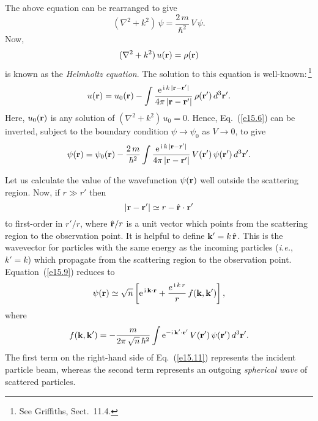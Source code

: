 The above equation can be rearranged to give
\begin{equation}\label{e15.6}
(\nabla^2+k^2)\,\psi = \frac{2\,m}{\hbar^2}\,V\,\psi.
\end{equation}
Now, 
\begin{equation}
(\nabla^2+k^2)\,u({\bf r}) = \rho({\bf r})
\end{equation}
is known as the {\em Helmholtz equation}. The solution to this
equation is well-known:\,\footnote{See Griffiths, Sect.~11.4.}
\begin{equation}
u({\bf r}) = u_0({\bf r}) - \int \frac{{\rm e}^{\,{\rm i}\,k\,|{\bf r}-{\bf r}'|}}
{4\pi\,|{\bf r}-{\bf r}'|}\,\rho({\bf r}')\,d^3{\bf r}'.
\end{equation}
Here, $u_0({\bf r})$ is any solution of $(\nabla^2+k^2)\,u_0 = 0$.
Hence, Eq.~(\ref{e15.6}) can be inverted, subject to the boundary condition
$\psi\rightarrow\psi_0$ as $V\rightarrow 0$, to give
\begin{equation}\label{e15.9}
\psi({\bf r}) = \psi_0({\bf r})- \frac{2\,m}{\hbar^2}
\int\frac{{\rm e}^{\,{\rm i}\,k\,|{\bf r}-{\bf r}'|}}
{4\pi\,|{\bf r}-{\bf r}'|}\,V({\bf r}')\,\psi({\bf r}')\,d^3{\bf r}'.
\end{equation}

Let us calculate the value of the wavefunction $\psi({\bf r})$  well outside the
scattering region. Now, if $r\gg r'$ then
\begin{equation}
|{\bf r}-{\bf r}'| \simeq r - \hat{\bf r}\cdot {\bf r}'
\end{equation}
to first-order in $r'/r$, where $\hat{\bf r}/r$ is a unit vector
which points from the scattering region to the observation point.
It is helpful to define ${\bf k}'=k\,\hat{\bf r}$. This is the wavevector
for particles with the same energy as the incoming particles ({\em i.e.},
$k'=k$) which propagate from the scattering region to the observation
point. Equation~(\ref{e15.9}) reduces to
\begin{equation}\label{e15.11}
\psi({\bf r}) \simeq \sqrt{n}\left[{\rm e}^{\,{\rm i}\,{\bf k}\cdot{\bf r}}
+ \frac{e^{\,{\rm i}\,k\,r}}{r}\,f({\bf k}, {\bf k}')\right],
\end{equation}
where
\begin{equation}\label{e5.12}
f({\bf k},{\bf k}') = -\frac{m}{2\pi\,\sqrt{n}\,\hbar^2}\int
{\rm e}^{-{\rm i}\,{\bf k}'\cdot{\bf r}'}\,V({\bf r}')\,\psi({\bf r}')\,d^3{\bf r}'.
\end{equation}
The first term on the right-hand side of Eq.~(\ref{e15.11}) represents the incident particle
beam, whereas the second term represents an outgoing {\em spherical wave}\/
of scattered particles.

